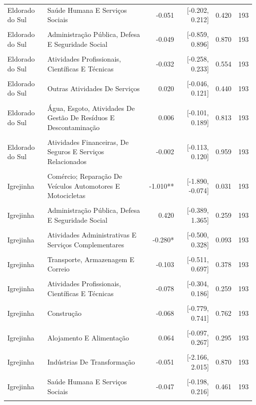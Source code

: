 \begin{tabular}{llrrrr}
Eldorado do Sul & Saúde Humana E Serviços Sociais & -0.051 & [-0.202, 0.212] & 0.420 & 193 \\\\
Eldorado do Sul & Administração Pública, Defesa E Seguridade Social & -0.049 & [-0.859, 0.896] & 0.870 & 193 \\\\
Eldorado do Sul & Atividades Profissionais, Científicas E Técnicas & -0.032 & [-0.258, 0.233] & 0.554 & 193 \\\\
Eldorado do Sul & Outras Atividades De Serviços & 0.020 & [-0.046, 0.121] & 0.440 & 193 \\\\
Eldorado do Sul & Água, Esgoto, Atividades De Gestão De Resíduos E Descontaminação & 0.006 & [-0.101, 0.189] & 0.813 & 193 \\\\
Eldorado do Sul & Atividades Financeiras, De Seguros E Serviços Relacionados & -0.002 & [-0.113, 0.120] & 0.959 & 193 \\\\
Igrejinha & Comércio; Reparação De Veículos Automotores E Motocicletas & -1.010** & [-1.890, -0.074] & 0.031 & 193 \\\\
Igrejinha & Administração Pública, Defesa E Seguridade Social & 0.420 & [-0.389, 1.365] & 0.259 & 193 \\\\
Igrejinha & Atividades Administrativas E Serviços Complementares & -0.280* & [-0.500, 0.328] & 0.093 & 193 \\\\
Igrejinha & Transporte, Armazenagem E Correio & -0.103 & [-0.511, 0.697] & 0.378 & 193 \\\\
Igrejinha & Atividades Profissionais, Científicas E Técnicas & -0.078 & [-0.304, 0.186] & 0.259 & 193 \\\\
Igrejinha & Construção & -0.068 & [-0.779, 0.741] & 0.762 & 193 \\\\
Igrejinha & Alojamento E Alimentação & 0.064 & [-0.097, 0.267] & 0.295 & 193 \\\\
Igrejinha & Indústrias De Transformação & -0.051 & [-2.166, 2.015] & 0.870 & 193 \\\\
Igrejinha & Saúde Humana E Serviços Sociais & -0.047 & [-0.198, 0.216] & 0.461 & 193 \\\\

\end{tabular}
